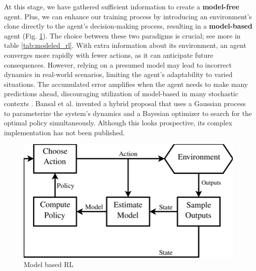 \documentclass[../main.tex]{subfiles}
\begin{document}
At this stage, we have gathered sufficient information to create a \textbf{model-free} agent. Plus, we can enhance our training process by introducing an environment's clone directly to the agent's decision-making process, resulting in a \textbf{model-based} agent (Fig. \ref{fig:model_basedRL}). The choice between these two paradigms is crucial; see more in table \ref{tab:modeled_rl}. With extra information about its environment, an agent converges more rapidly with fewer actions, as it can anticipate future consequences. However, relying on a presumed model may lead to incorrect dynamics in real-world scenarios, limiting the agent's adaptability to varied situations. The accumulated error amplifies when the agent needs to make many predictions ahead, discouraging utilization of model-based in many stochastic contexts \cite{janner2021trust, janner2019mbpo, wang2019benchmarking}. Bansal et al. \cite{bansal2017mbmf} invented a hybrid proposal that uses a Gaussian process to parameterize the system's dynamics and a Bayesian optimizer to search for the optimal policy simultaneously. Although this looks prospective, its complex implementation has not been published.
\begin{figure}[htbp]
    \centering
    \includegraphics[width=0.75\linewidth]{figures/model_basedRL.png}
    \caption{Model based RL}
    \label{fig:model_basedRL}
\end{figure}
\end{document}
